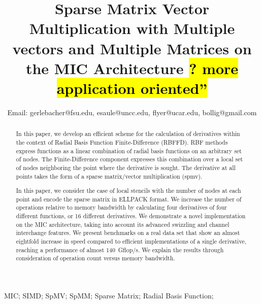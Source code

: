 \documentclass[10pt,conference,compsocconf]{IEEEtran}
\newcommand{\todo}[1]{{\color{red}\textbf{\hl{#1}}\xspace}}
\begin{document}
\title{Sparse Matrix Vector Multiplication with Multiple vectors and
  Multiple Matrices on the MIC Architecture \todo{? more application oriented''}}


\author{
Email: gerlebacher@fsu.edu, esaule@uncc.edu, flyer@ucar.edu, bollig@gmail.com}
\maketitle


\begin{abstract}
In this paper, we develop an efficient scheme for the calculation of
derivatives within the context of Radial Basis Function
Finite-Difference (RBFFD). RBF methods express functions as a linear
combination of radial basis functions on an arbitrary set of
nodes. The Finite-Difference component expresses this combination over
a local set of nodes neighboring the point where the derivative is
sought.  The derivative at all points takes the form of a sparse
matrix/vector multiplication (spmv).

In this paper, we consider the case of local stencils with the number
of nodes at each point and encode the sparse matrix in ELLPACK
format. We increase the number of operations relative to memory
bandwidth by calculating four derivatives of four different functions,
or 16 different derivatives. We demonstrate a novel implementation on
the MIC architecture, taking into account its advanced swizzling and
channel interchange features. We present benchmarks on a real data
set that show an almost eightfold increase in speed compared to
efficient implementations of a single derivative, reaching a
performance of almost 140~Gflop/s. We explain the results through
consideration of operation count versus memory bandwidth.
\end{abstract}

\begin{IEEEkeywords}
MIC; SIMD; SpMV; SpMM; Sparse Matrix; Radial Basis Function;
\end{IEEEkeywords}
\end{document}

